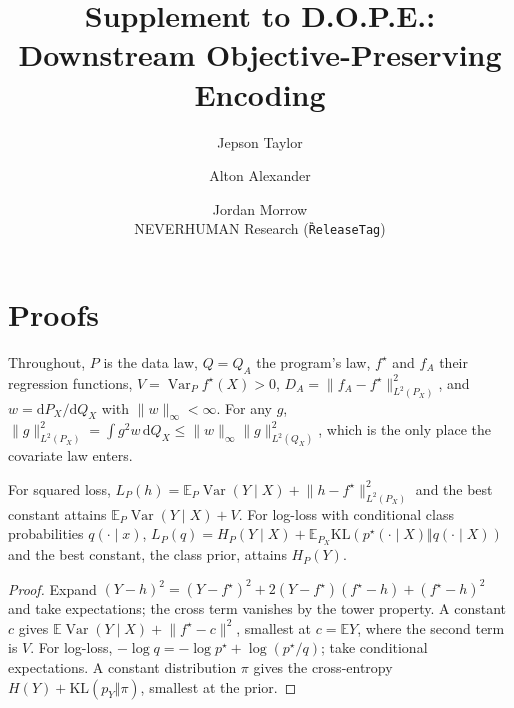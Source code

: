\documentclass[10pt,letterpaper]{article}
\title{\textbf{Supplement to D.O.P.E.: Downstream Objective-Preserving Encoding}}
\author{Jepson Taylor \and Alton Alexander \and Jordan Morrow\\[0.2em]\small NEVERHUMAN Research \quad (\texttt{\G{ReleaseTag}})}
\date{}
\begin{document}
\maketitle

\section{Proofs}
\label{app:proofs}

Throughout, $P$ is the data law, $Q=Q_A$ the program's law, $f^\star$ and $f_A$ their regression
functions, $V=\operatorname{Var}_P f^\star(X)>0$, $D_A=\lVert f_A-f^\star\rVert^2_{L^2(P_X)}$, and
$w=\mathrm{d}P_X/\mathrm{d}Q_X$ with $\lVert w\rVert_\infty<\infty$. For any $g$,
$\lVert g\rVert^2_{L^2(P_X)}=\int g^2 w\,\mathrm{d}Q_X\le\lVert w\rVert_\infty\lVert g\rVert^2_{L^2(Q_X)}$,
which is the only place the covariate law enters.

\begin{lemma}
\label{lem:decomp}
For squared loss, $L_P(h)=\mathbb{E}_P\operatorname{Var}(Y\mid X)+\lVert h-f^\star\rVert^2_{L^2(P_X)}$ and the best
constant attains $\mathbb{E}_P\operatorname{Var}(Y\mid X)+V$. For log-loss with conditional class probabilities
$q(\cdot\mid x)$, $L_P(q)=H_P(Y\mid X)+\mathbb{E}_{P_X}\mathrm{KL}(p^\star(\cdot\mid X)\Vert q(\cdot\mid X))$ and the
best constant, the class prior, attains $H_P(Y)$.
\end{lemma}

\begin{proof}
Expand $(Y-h)^2=(Y-f^\star)^2+2(Y-f^\star)(f^\star-h)+(f^\star-h)^2$ and take expectations; the cross
term vanishes by the tower property. A constant $c$ gives $\mathbb{E}\operatorname{Var}(Y\mid X)+\lVert f^\star-c\rVert^2$,
smallest at $c=\mathbb{E}Y$, where the second term is $V$. For log-loss,
$-\log q=-\log p^\star+\log(p^\star/q)$; take conditional expectations. A constant distribution $\pi$ gives
the cross-entropy $H(Y)+\mathrm{KL}(p_Y\Vert\pi)$, smallest at the prior.
\end{proof}
\end{document}
